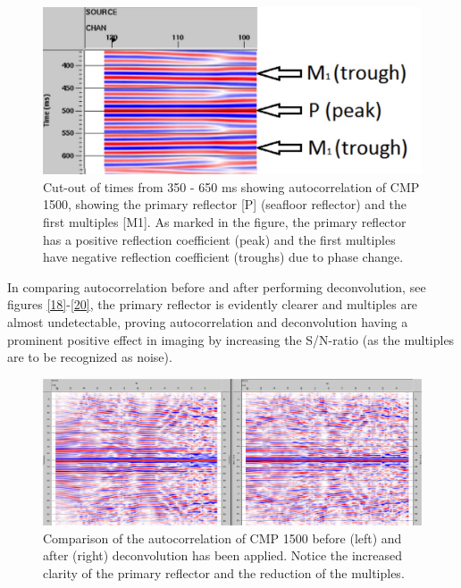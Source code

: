 \documentclass[10pt,a4paper]{article}
\begin{document}
\begin{figure}[H]
\includegraphics[width=\textwidth]{fig17.jpg}
\caption{Cut-out of times from 350 - 650 ms showing autocorrelation of CMP 1500, showing the primary reflector [P] (seafloor reflector) and the first multiples [M1]. As marked in the figure, the primary reflector has a positive reflection coefficient (peak) and the first multiples have negative reflection coefficient (troughs) due to phase change.}
\label{fig17}
\end{figure}

\noindent In comparing autocorrelation before and after performing deconvolution, see figures \ref{18}-\ref{20}, the primary reflector is evidently clearer and multiples are almost undetectable, proving autocorrelation and deconvolution having a prominent positive effect in imaging by increasing the S/N-ratio (as the multiples are to be recognized as noise).

\begin{figure}[H]
\includegraphics[width=\textwidth]{fig18.jpg}
\caption{Comparison of the autocorrelation of CMP 1500 before (left) and after (right) deconvolution has been applied. Notice the increased clarity of the primary reflector and the reduction of the multiples.}
\label{fig18}
\end{figure}
\end{document}
